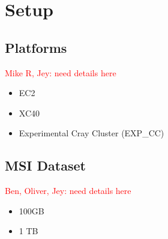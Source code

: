 \section{Setup}
\label{sec:setup}

\subsection{Platforms}
\textcolor{red}{Mike R, Jey: need details here}
\begin{itemize}
  \item EC2
  \item XC40
  \item Experimental Cray Cluster (EXP\_CC)
\end{itemize}

\subsection{MSI Dataset}
\textcolor{red}{Ben, Oliver, Jey: need details here}
\begin{itemize}
  \item 100GB
  \item 1 TB
\end{itemize}

